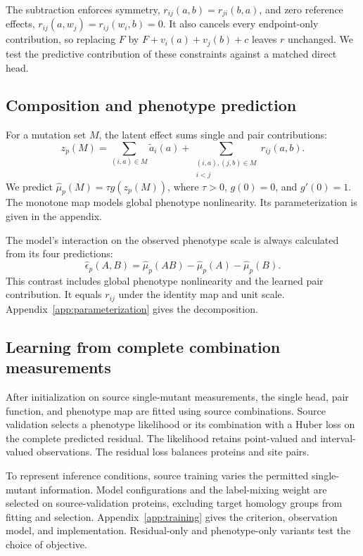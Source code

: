 \documentclass{llncs}
\begin{document}
The subtraction enforces symmetry, $r_{ij}(a,b)=r_{ji}(b,a)$, and zero reference effects, $r_{ij}(a,w_j)=r_{ij}(w_i,b)=0$. It also cancels every endpoint-only contribution, so replacing $F$ by $F+v_i(a)+v_j(b)+c$ leaves $r$ unchanged. We test the predictive contribution of these constraints against a matched direct head.

\subsection{Composition and phenotype prediction}

For a mutation set $M$, the latent effect sums single and pair contributions:
\begin{equation}
z_p(M)=\sum_{(i,a)\in M}\widetilde a_i(a)
+\sum_{\substack{(i,a),(j,b)\in M\\i<j}}r_{ij}(a,b).
\end{equation}
We predict $\widehat\mu_p(M)=\tau g(z_p(M))$, where $\tau>0$, $g(0)=0$, and $g'(0)=1$. The monotone map models global phenotype nonlinearity. Its parameterization is given in the appendix.

The model's interaction on the observed phenotype scale is always calculated from its four predictions:
\begin{equation}
\widehat\epsilon_p(A,B)=\widehat\mu_p(AB)-\widehat\mu_p(A)-\widehat\mu_p(B).
\label{eq:predicted}
\end{equation}
This contrast includes global phenotype nonlinearity and the learned pair contribution. It equals $r_{ij}$ under the identity map and unit scale. Appendix~\ref{app:parameterization} gives the decomposition.

\subsection{Learning from complete combination measurements}

After initialization on source single-mutant measurements, the single head, pair function, and phenotype map are fitted using source combinations. Source validation selects a phenotype likelihood or its combination with a Huber loss on the complete predicted residual. The likelihood retains point-valued and interval-valued observations. The residual loss balances proteins and site pairs.

To represent inference conditions, source training varies the permitted single-mutant information. Model configurations and the label-mixing weight are selected on source-validation proteins, excluding target homology groups from fitting and selection. Appendix~\ref{app:training} gives the criterion, observation model, and implementation. Residual-only and phenotype-only variants test the choice of objective.
\end{document}
